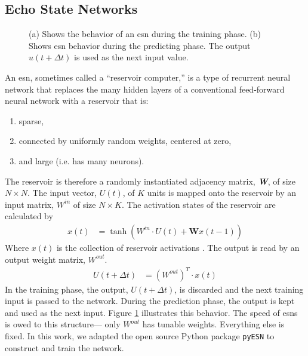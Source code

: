 \subsection{Echo State Networks}

\begin{figure}[htp]
  \centering


  \caption{(a) Shows the behavior of an \gls{esn} during the training phase. (b) Shows \gls{esn} behavior during the predicting phase. The output $u(t+\Delta t)$ is used as the next input value. }
  \label{fig:reservoir_graph}
\end{figure}

An \gls{esn}, sometimes called a ``reservoir
computer,''\cite{pathak_using_2017, pathak_model-free_2018, vlachas_backpropagation_2020} is a type of recurrent
neural network that replaces the many hidden layers of a conventional feed-forward
neural network with a reservoir that is:
\begin{enumerate}
  \item sparse,
  \item connected by uniformly random weights, centered at zero,
  \item and large (i.e. has many neurons).
\end{enumerate}

The reservoir is therefore a randomly instantiated adjacency matrix,
\textit{\textbf{W}}, of size $N \times N$. The input vector, $U(t)$, of
$K$ units is mapped onto the reservoir by an input matrix,
 $W^{in}$ of size $N \times K$. The activation states of the reservoir are calculated by
 \begin{align}
   x(t) &= \tanh \left(W^{in}\cdot U(t) + \mathbf{W}x(t-1)\right)
 \end{align}
 Where $x(t)$ is the collection of reservoir activations \cite{shi_energy_2016, pathak_model-free_2018, lukosevicius_practical_2012}.
 The output is read by an output weight matrix,
 $W^{out}$.
 \begin{align}
   U(t+\Delta t) &= \left(W^{out}\right)^T\cdot x(t)
 \end{align}
 In the training phase, the output, $U(t+\Delta t)$, is
 discarded and the next training input is passed to the network. During the
 prediction phase, the output is kept and used as the next input. Figure \ref{fig:reservoir_graph} illustrates this behavior. The speed of \glspl{esn} is owed
 to this structure--- only $W^{out}$ has tunable weights. Everything else is
 fixed. In this work, we adapted the open source Python package \texttt{pyESN} \cite{korndorfer_pyesn_2015} to construct and train the network.

